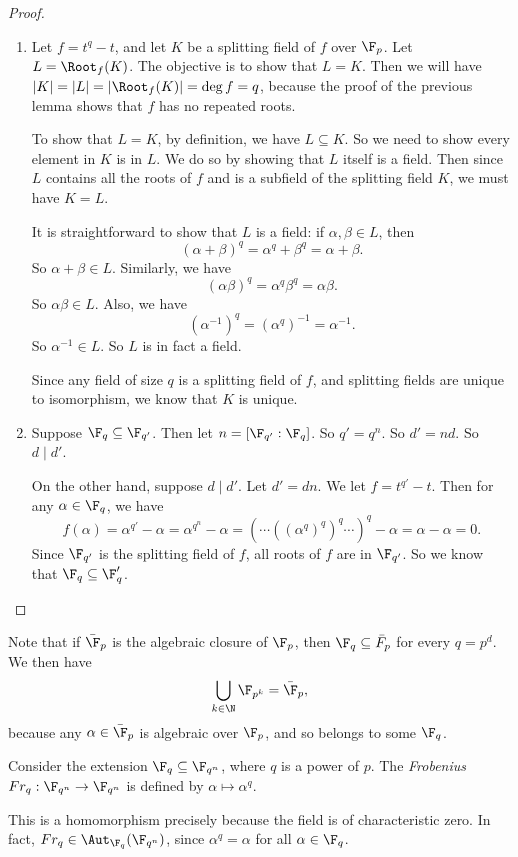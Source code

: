 \documentclass[a4paper]{article}
\begin{document}
\begin{proof}\leavevmode
  \begin{enumerate}
    \item Let $f = t^q - t$, and let $K$ be a splitting field of $f$ over $\F_p$. Let $L = \Root_f(K)$. The objective is to show that $L = K$. Then we will have $|K| = |L| = |\Root_f(K)| = \deg f = q$, because the proof of the previous lemma shows that $f$ has no repeated roots.

      To show that $L = K$, by definition, we have $L \subseteq K$. So we need to show every element in $K$ is in $L$. We do so by showing that $L$ itself is a field. Then since $L$ contains all the roots of $f$ and is a subfield of the splitting field $K$, we must have $K = L$.

      It is straightforward to show that $L$ is a field: if $\alpha, \beta \in L$, then
      \[
        (\alpha + \beta)^q = \alpha^q + \beta^q = \alpha + \beta.
      \]
      So $\alpha + \beta \in L$. Similarly, we have
      \[
        (\alpha\beta)^q = \alpha^q \beta^q = \alpha\beta.
      \]
      So $\alpha\beta \in L$. Also, we have
      \[
        (\alpha^{-1})^q = (\alpha^q)^{-1} = \alpha^{-1}.
      \]
      So $\alpha^{-1} \in L$. So $L$ is in fact a field.

      Since any field of size $q$ is a splitting field of $f$, and splitting fields are unique to isomorphism, we know that $K$ is unique.
    \item Suppose $\F_q \subseteq \F_{q'}$. Then let $n = [\F_{q'}: \F_q]$. So $q' = q^n$. So $d'= nd$. So $d \mid d'$.

      On the other hand, suppose $d \mid d'$. Let $d' = dn$. We let $f = t^{q'} - t$. Then for any $\alpha \in \F_q$, we have
      \[
        f(\alpha) = \alpha^{q'} - \alpha = \alpha^{q^n} - \alpha = (\cdots ((\alpha^q)^q)^q\cdots )^q - \alpha = \alpha - \alpha = 0.
      \]
      Since $\F_{q'}$ is the splitting field of $f$, all roots of $f$ are in $\F_{q'}$. So we know that $\F_q \subseteq \F_q'$.
  \end{enumerate}
\end{proof}
Note that if $\bar{\F}_p$ is the algebraic closure of $\F_p$, then $\F_q \subseteq \bar{F}_p$ for every $q = p^d$. We then have
\[
  \bigcup_{k \in \N} \F_{p^k} = \bar{\F}_p,
\]
because any $\alpha \in \bar{\F}_p$ is algebraic over $\F_p$, and so belongs to some $\F_q$.

\begin{defi}
  Consider the extension $\F_q \subseteq \F_{q^n}$, where $q$ is a power of $p$. The \emph{Frobenius} $Fr_q: \F_{q^n} \to \F_{q^n}$ is defined by $\alpha\mapsto \alpha^q$.
\end{defi}
This is a homomorphism precisely because the field is of characteristic zero. In fact, $Fr_q \in \Aut_{\F_q} (\F_{q^n})$, since $\alpha^q = \alpha$ for all $\alpha \in \F_q$.
\end{document}
